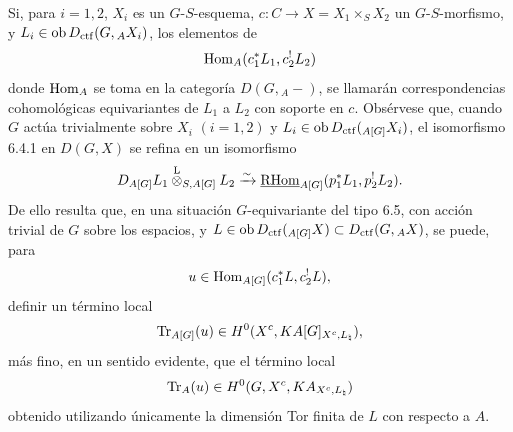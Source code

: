 Si, para $i=1,2$, $X_i$ es un $G$-$S$-esquema, $c:C\to X=X_1\times_SX_2$ un $G$-$S$-morfismo, y $L_i\in\operatorname{ob} D_{\mathrm{ctf}}(G,{}_AX_i)$, los elementos de
\[
\operatorname{Hom}_A(c_1^*L_1,c_2^!L_2)
\]
donde $\operatorname{Hom}_A$ se toma en la categoría $D(G,{}_A-)$, se llamarán correspondencias cohomológicas equivariantes de $L_1$ a $L_2$ con soporte en $c$. Obsérvese que, cuando $G$ actúa trivialmente sobre $X_i$ $(i=1,2)$ y $L_i\in\operatorname{ob} D_{\mathrm{ctf}}({}_{A[G]}X_i)$, el isomorfismo 6.4.1 en $D(G,X)$ se refina en un isomorfismo
\[
D_{A[G]}L_1\overset{\mathrm L}{\otimes}_{S,A[G]}L_2
\xrightarrow{\sim}
\underline{\mathrm{RHom}}_{A[G]}(p_1^*L_1,p_2^!L_2).
\]
De ello resulta que, en una situación $G$-equivariante del tipo 6.5, con acción trivial de $G$ sobre los espacios, y $L\in\operatorname{ob} D_{\mathrm{ctf}}({}_{A[G]}X)\subset D_{\mathrm{ctf}}(G,{}_AX)$, se puede, para
\[
u\in\operatorname{Hom}_{A[G]}(c_1^*L,c_2^!L),
\]
definir un término local
\[
\operatorname{Tr}_{A[G]}(u)\in H^0(X^c,KA[G]_{X^c,L_{\natural}}),
\]
más fino, en un sentido evidente, que el término local
\[
\operatorname{Tr}_A(u)\in H^0(G,X^c,KA_{X^c,L_{\natural}})
\]
obtenido utilizando únicamente la dimensión Tor finita de $L$ con respecto a $A$.
